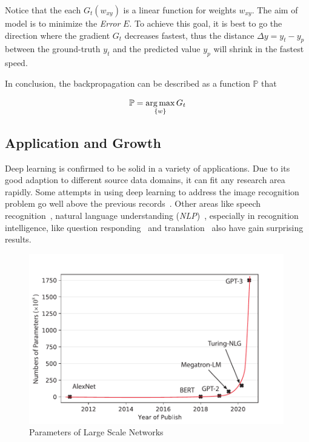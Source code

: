 \begin{spacing}{1.5}
Notice that the each $G_t(w_{xy})$ is a linear function for weights $w_{xy}$. The aim of model is to minimize the \textit{Error} $E$. To achieve this goal, it is best to go the direction where the gradient $G_t$ decreases fastest, thus the distance $\Delta y=y_t-y_p$ between the ground-truth $y_t$ and the predicted value $y_p$ will shrink in the fastest speed.

In conclusion, the backpropagation can be described as a function $\mathbb{P}$ that

\begin{equation}
    \mathbb{P}=\operatorname*{arg\,max}_{\{w\}}G_t
\end{equation}

\subsection{Application and Growth}

Deep learning is confirmed to be solid in a variety of applications. Due to its good adaption to different source data domains, it can fit any research area rapidly. Some attempts in using deep learning to address the image recognition problem go well above the previous records~\cite{krizhevsky2012imagenet, farabet2012learning, tompson2014joint, szegedy2015going}. Other areas like speech recognition~\cite{mikolov2011strategies, hinton2012deep, sainath2013deep}, natural language understanding (\textit{NLP})~\cite{collobert2011natural}, especially in recognition intelligence, like question responding~\cite{bordes2014question} and translation~\cite{jean2014using, sutskever2014sequence} also have gain surprising results. 

\begin{figure}[ht]
\centering
\includegraphics[width=0.99\textwidth, fbox]{Chapter2/paramnum.pdf}
\caption{Parameters of Large Scale Networks}
\label{fig:paramnum} 
\end{figure}


\end{spacing}
